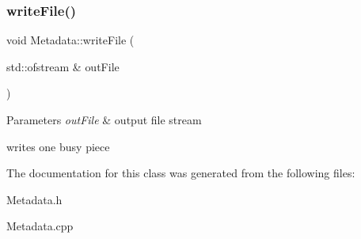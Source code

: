 \subsubsection{\texorpdfstring{write\+File()}{writeFile()}}
{\footnotesize\ttfamily void Metadata\+::write\+File (\begin{DoxyParamCaption}\item[{std\+::ofstream \&}]{out\+File }\end{DoxyParamCaption})}


\begin{DoxyParams}{Parameters}
{\em out\+File} & output file stream\\
\hline
\end{DoxyParams}
writes one busy piece 

The documentation for this class was generated from the following files\+:\begin{DoxyCompactItemize}
\item 
Metadata.\+h\item 
Metadata.\+cpp\end{DoxyCompactItemize}
